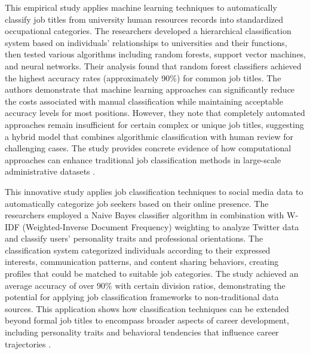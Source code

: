 \documentclass[../main.tex]{subfiles}
\begin{document}
This empirical study applies machine learning techniques to automatically classify job titles from university human resources records into standardized occupational categories. The researchers developed a hierarchical classification system based on individuals' relationships to universities and their functions, then tested various algorithms including random forests, support vector machines, and neural networks. Their analysis found that random forest classifiers achieved the highest accuracy rates (approximately 90\%) for common job titles. The authors demonstrate that machine learning approaches can significantly reduce the costs associated with manual classification while maintaining acceptable accuracy levels for most positions. However, they note that completely automated approaches remain insufficient for certain complex or unique job titles, suggesting a hybrid model that combines algorithmic classification with human review for challenging cases. The study provides concrete evidence of how computational approaches can enhance traditional job classification methods in large-scale administrative datasets \parencite{ikudo2018}.

This innovative study applies job classification techniques to social media data to automatically categorize job seekers based on their online presence. The researchers employed a Naive Bayes classifier algorithm in combination with W-IDF (Weighted-Inverse Document Frequency) weighting to analyze Twitter data and classify users' personality traits and professional orientations. The classification system categorized individuals according to their expressed interests, communication patterns, and content sharing behaviors, creating profiles that could be matched to suitable job categories. The study achieved an average accuracy of over 90\% with certain division ratios, demonstrating the potential for applying job classification frameworks to non-traditional data sources. This application shows how classification techniques can be extended beyond formal job titles to encompass broader aspects of career development, including personality traits and behavioral tendencies that influence career trajectories \parencite{jeesr2021}.
\end{document}

